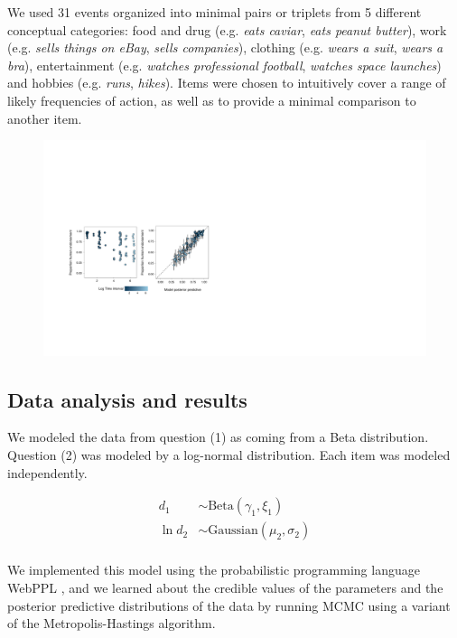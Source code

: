 \documentclass[10pt,letterpaper]{article}
\begin{document}
We used 31 events organized into minimal pairs or triplets from 5 different conceptual categories: food and drug (e.g. \emph{eats caviar}, \emph{eats peanut butter}), work (e.g. \emph{sells things on eBay}, \emph{sells companies}), clothing (e.g. \emph{wears a suit}, \emph{wears a bra}), entertainment (e.g. \emph{watches professional football}, \emph{watches space launches}) and hobbies (e.g. \emph{runs}, \emph{hikes}). 
Items were chosen to intuitively cover a range of likely frequencies of action, as well as to provide a minimal comparison to another item.

\begin{figure}[t]
\centering
  \includegraphics[width=\textwidth]{tj-scatters1}
  \caption{}
  \label{fig:tjScatters}
\end{figure}


\subsection{Data analysis and results}

We modeled the data from question (1) as coming from a Beta distribution. 
Question (2) was modeled by a log-normal distribution. 
Each item was modeled independently.
%
\begin{minipage}{0.5 \textwidth} \small
\begin{align*}
d_{1} &\sim \text{Beta}(\gamma_{1}, \xi_{1}) \\
\ln d_{2} &\sim \text{Gaussian}(\mu_{2}, \sigma_{2}) \\
\end{align*}
\end{minipage}
%
We implemented this model using the probabilistic programming language WebPPL \cite{dippl}, and we learned about the credible values of the parameters and the posterior predictive distributions of the data by running MCMC using a variant of the Metropolis-Hastings algorithm.
%
\end{document}
